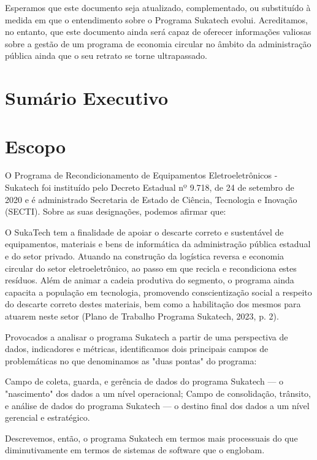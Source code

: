 \documentclass[
	12pt,				%
	openright,			%
	twoside,			%
	a4paper,			%
	english,			%
	french,				%
	spanish,			%
	brazil,				%
	]{abntex2}
\begin{document}
Esperamos que este documento seja atualizado, complementado, ou substituído à medida em que o entendimento sobre o Programa Sukatech evolui. Acreditamos, no entanto, que este documento ainda será capaz de oferecer informações valiosas sobre a gestão de um programa de economia circular no âmbito da administração pública ainda que o seu retrato se torne ultrapassado.

\chapter*[Sumário Executivo]{Sumário Executivo}

\chapter*[Escopo]{Escopo}

O Programa de Recondicionamento de Equipamentos Eletroeletrônicos - Sukatech foi instituído pelo Decreto Estadual nº 9.718, de 24 de setembro de 2020 e é administrado Secretaria de Estado de Ciência, Tecnologia e Inovação (SECTI). Sobre as suas designações, podemos afirmar que:

    O SukaTech tem a finalidade de apoiar o descarte correto e sustentável de equipamentos, materiais e bens de informática da administração pública estadual e do setor privado. Atuando na construção da logística reversa e economia circular do setor eletroeletrônico, ao passo em que recicla e recondiciona estes resíduos. Além de animar a cadeia produtiva do segmento, o programa ainda capacita a população em tecnologia, promovendo conscientização social a respeito do descarte correto destes materiais, bem como a habilitação dos mesmos para atuarem neste setor (Plano de Trabalho Programa Sukatech, 2023, p. 2).

Provocados a analisar o programa Sukatech a partir de uma perspectiva de dados, indicadores e métricas, identificamos dois principais campos de problemáticas no que denominamos as "duas pontas" do programa:

    Campo de coleta, guarda, e gerência de dados do programa Sukatech — o "nascimento" dos dados a um nível operacional;
    Campo de consolidação, trânsito, e análise de dados do programa Sukatech — o destino final dos dados a um nível gerencial e estratégico.

Descrevemos, então, o programa Sukatech em termos mais processuais do que diminutivamente em termos de sistemas de software que o englobam.
\end{document}
